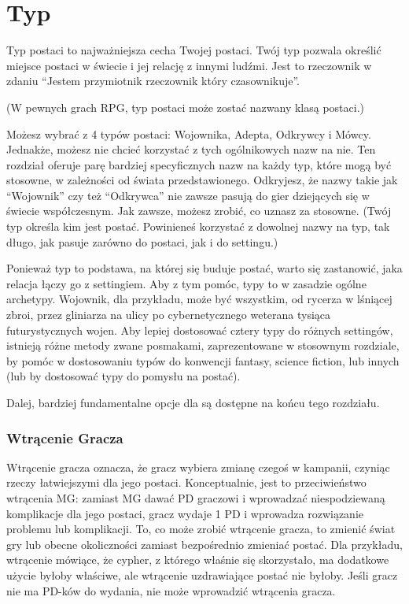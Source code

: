 \section{Typ}

Typ postaci to najważniejsza cecha Twojej postaci. Twój typ pozwala określić miejsce postaci w świecie i jej relację z innymi ludźmi. Jest to rzeczownik w zdaniu “Jestem przymiotnik rzeczownik który czasownikuje”.

(W pewnych grach RPG, typ postaci może zostać nazwany klasą postaci.)

Możesz wybrać z 4 typów postaci: Wojownika, Adepta, Odkrywcy i Mówcy. Jednakże, możesz nie chcieć korzystać z tych ogólnikowych nazw na nie. Ten rozdział oferuje parę bardziej specyficznych nazw na każdy typ, które mogą być stosowne, w zależności od świata przedstawionego. Odkryjesz, że nazwy takie jak “Wojownik” czy też “Odkrywca” nie zawsze pasują do gier dziejących się w świecie współczesnym. Jak zawsze, możesz zrobić, co uznasz za stosowne. (Twój typ określa kim jest postać. Powinieneś korzystać z dowolnej nazwy na typ, tak długo, jak pasuje zarówno do postaci, jak i do settingu.)

Ponieważ typ to podstawa, na której się buduje postać, warto się zastanowić, jaka relacja łączy go z settingiem. Aby z tym pomóc, typy to w zasadzie ogólne archetypy. Wojownik, dla przykładu, może być wszystkim, od rycerza w lśniącej zbroi, przez gliniarza na ulicy po cybernetycznego weterana tysiąca futurystycznych wojen.
Aby lepiej dostosować cztery typy do różnych settingów, istnieją różne metody zwane posmakami,  zaprezentowane w stosownym rozdziale, by pomóc w dostosowaniu typów do konwencji fantasy, science fiction, lub innych (lub by dostosować typy do pomysłu na postać).

Dalej, bardziej fundamentalne opcje dla  są dostępne na końcu tego rozdziału. 

\subsubsection{Wtrącenie Gracza}

Wtrącenie gracza oznacza, że gracz wybiera zmianę czegoś w kampanii, czyniąc rzeczy łatwiejszymi dla jego postaci. Konceptualnie, jest to przeciwieństwo wtrącenia MG: zamiast MG dawać PD graczowi i wprowadzać niespodziewaną komplikacje dla jego postaci, gracz wydaje 1 PD i wprowadza rozwiązanie problemu lub komplikacji. To, co może zrobić wtrącenie gracza, to zmienić świat gry lub obecne okoliczności zamiast bezpośrednio zmieniać postać. Dla przykładu, wtrącenie mówiące, że cypher, z którego właśnie się skorzystało, ma dodatkowe użycie byłoby właściwe, ale wtrącenie uzdrawiające postać nie byłoby. Jeśli gracz nie ma PD-ków do wydania, nie może wprowadzić wtrącenia gracza. 

